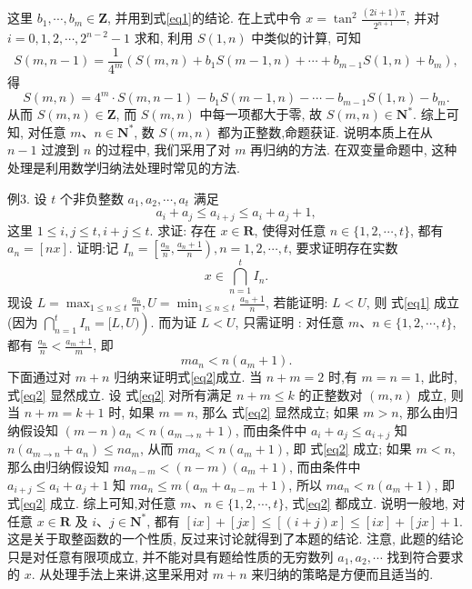 这里 $b_1, \cdots, b_m \in \mathbf{Z}$, 并用到式\ref{eq1}的结论.
在上式中令 $x=\tan ^2 \frac{(2 i+1) \pi}{2^{n+1}}$, 并对 $i=0,1,2, \cdots, 2^{n-2}-1$ 求和, 利用 $S(1, n)$ 中类似的计算, 可知
$$
S(m, n-1)=\frac{1}{4^m}\left(S(m, n)+b_1 S(m-1, n)+\cdots+b_{m-1} S(1, n)+b_m\right),
$$
得
$$
S(m, n)=4^m \cdot S(m, n-1)-b_1 S(m-1, n)-\cdots-b_{m-1} S(1, n)-b_m .
$$
从而 $S(m, n) \in \mathbf{Z}$, 而 $S(m, n)$ 中每一项都大于零, 故 $S(m, n) \in \mathbf{N}^*$.
综上可知, 对任意 $m 、 n \in \mathbf{N}^*$, 数 $S(m, n)$ 都为正整数,命题获证.
说明本质上在从 $n-1$ 过渡到 $n$ 的过程中, 我们采用了对 $m$ 再归纳的方法.
在双变量命题中, 这种处理是利用数学归纳法处理时常见的方法.



例3. 设 $t$ 个非负整数 $a_1, a_2, \cdots, a_t$ 满足
$$
a_i+a_j \leqslant a_{i+j} \leqslant a_i+a_j+1,
$$
这里 $1 \leqslant i, j \leqslant t, i+j \leqslant t$.
求证: 存在 $x \in \mathbf{R}$, 使得对任意 $n \in\{1,2, \cdots, t\}$, 都有 $a_n=[n x]$.
证明:记 $I_n=\left[\frac{a_n}{n}, \frac{a_n+1}{n}\right), n=1,2, \cdots, t$, 要求证明存在实数
$$
x \in \bigcap_{n=1}^t I_n . \label{eq1}
$$
现设 $L=\max _{1 \leqslant n \leqslant t} \frac{a_n}{n}, U=\min _{1 \leqslant n \leqslant t} \frac{a_n+1}{n}$, 若能证明: $L<U$, 则 式\ref{eq1} 成立 (因为
$\left.\bigcap_{n=1}^t I_n=[L, U)\right)$. 而为证 $L<U$, 只需证明 : 对任意 $m 、 n \in\{1,2, \cdots, t\}$, 都有 $\frac{a_n}{n}<\frac{a_m+1}{m}$, 即
$$
m a_n<n\left(a_m+1\right) . \label{eq2}
$$
下面通过对 $m+n$ 归纳来证明式\ref{eq2}成立.
当 $n+m=2$ 时,有 $m=n=1$, 此时, 式\ref{eq2} 显然成立.
设 式\ref{eq2} 对所有满足 $n+ m \leqslant k$ 的正整数对 $(m, n)$ 成立, 则当 $n+m=k+1$ 时, 如果 $m=n$, 那么 式\ref{eq2} 显然成立; 如果 $m>n$, 那么由归纳假设知 $(m-n) a_n<n\left(a_{m \rightarrow n}+1\right)$, 而由条件中 $a_i+a_j \leqslant a_{i+j}$ 知 $n\left(a_{m \rightarrow n}+a_n\right) \leqslant n a_m$, 从而 $m a_n<n\left(a_m+1\right)$, 即 式\ref{eq2} 成立; 如果 $m<n$, 那么由归纳假设知 $m a_{n-m}<(n-m)\left(a_m+1\right)$, 而由条件中 $a_{i+j} \leqslant a_i+ a_j+1$ 知 $m a_n \leqslant m\left(a_m+a_{n-m}+1\right)$, 所以 $m a_n<n\left(a_m+1\right)$, 即 式\ref{eq2} 成立.
综上可知,对任意 $m 、 n \in\{1,2, \cdots, t\}$, 式\ref{eq2} 都成立.
说明一般地, 对任意 $x \in \mathbf{R}$ 及 $i 、 j \in \mathbf{N}^*$, 都有 $[i x]+[j x] \leqslant[(i+ j) x] \leqslant[i x]+[j x]+1$. 这是关于取整函数的一个性质, 反过来讨论就得到了本题的结论.
注意, 此题的结论只是对任意有限项成立, 并不能对具有题给性质的无穷数列 $a_1, a_2, \cdots$ 找到符合要求的 $x$.
从处理手法上来讲,这里采用对 $m+n$ 来归纳的策略是方便而且适当的.



